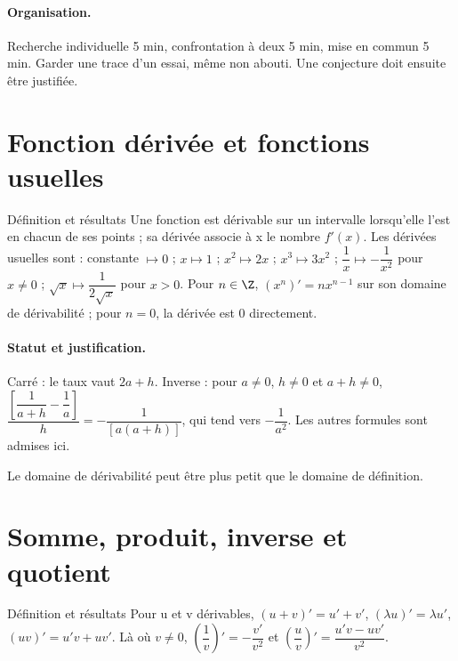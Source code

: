 \paragraph{Organisation.} Recherche individuelle 5 min, confrontation à deux 5 min, mise en commun 5 min. Garder une trace d’un essai, même non abouti. Une conjecture doit ensuite être justifiée.
\section{Fonction dérivée et fonctions usuelles}\label{C06-U1}
\begin{repere}{Définition et résultats}
Une fonction est dérivable sur un intervalle lorsqu’elle l’est en chacun de ses points ; sa dérivée associe à x le nombre $f\prime(x)$. Les dérivées usuelles sont : constante $\mapsto0$ ; $x\mapsto1$ ; $x^2\mapsto2x$ ; $x^3\mapsto3x^2$ ; $\dfrac{1}{x}\mapsto -\dfrac{1}{x^2}$ pour $x\ne0$ ; $\sqrt x\mapsto \dfrac{1}{2\sqrt x}$ pour $x>0$. Pour $n\in\Z$, $(x^n)\prime=nx^{n-1}$ sur son domaine de dérivabilité ; pour $n=0$, la dérivée est 0 directement.
\end{repere}
\paragraph{Statut et justification.} Carré : le taux vaut $2a+h$. Inverse : pour $a\ne0$, $h\ne0$ et $a+h\ne0$, $\dfrac{[\dfrac{1}{a+h}-\dfrac{1}{a}]}{h}=-\dfrac{1}{[a(a+h)]}$, qui tend vers $-\dfrac{1}{a^2}$. Les autres formules sont admises ici.
\label{C06-EX1}
\begin{erreur}Le domaine de dérivabilité peut être plus petit que le domaine de définition.\end{erreur}
\label{C06-AP1}
\section{Somme, produit, inverse et quotient}\label{C06-U2}
\begin{repere}{Définition et résultats}
Pour u et v dérivables, $(u+v)\prime=u\prime+v\prime$, $(\lambda u)\prime=\lambda u\prime$, $(uv)\prime=u\prime v+uv\prime$. Là où $v\ne0$, $(\dfrac{1}{v})\prime =-\dfrac{v\prime}{v^2}$ et $(\dfrac{u}{v})\prime =\dfrac{u\prime v-uv\prime}{v^2}$.
\end{repere}

